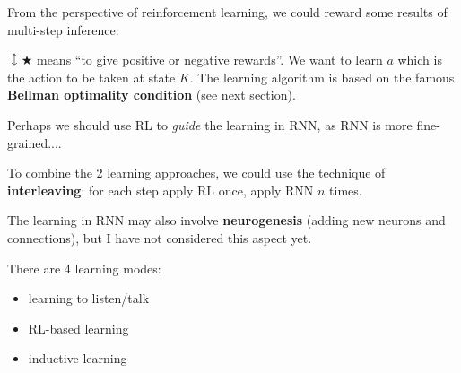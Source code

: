 \documentclass[12pt]{article}
\begin{document}


From the perspective of reinforcement learning, we could reward some results of multi-step inference: \par
\begin{figure}[H]
\centering
{}
\end{figure}
$\updownarrow \bigstar$ means ``to give positive or negative rewards''.  We want to learn $a$ which is the action to be taken at state $K$.  The learning algorithm is based on the famous \textbf{Bellman optimality condition} (see next section).

Perhaps we should use RL to \textit{guide} the learning in RNN, as RNN is more fine-grained....

To combine the 2 learning approaches, we could use the technique of \textbf{interleaving}: for each step apply RL once, apply RNN $n$ times.


The learning in RNN may also involve \textbf{neurogenesis} (adding new neurons and connections), but I have not considered this aspect yet.


There are 4 learning modes:
\begin{itemize}
\item learning to listen/talk
\item RL-based learning
\item inductive learning
\end{itemize}
\end{document}

